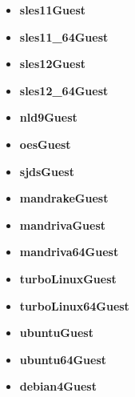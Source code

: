 \begin{itemize}
\item \textbf{sles11Guest} 
\end{itemize}
\begin{itemize}
\item \textbf{sles11\_64Guest} 
\end{itemize}
\begin{itemize}
\item \textbf{sles12Guest} 
\end{itemize}
\begin{itemize}
\item \textbf{sles12\_64Guest} 
\end{itemize}
\begin{itemize}
\item \textbf{nld9Guest} 
\end{itemize}
\begin{itemize}
\item \textbf{oesGuest} 
\end{itemize}
\begin{itemize}
\item \textbf{sjdsGuest} 
\end{itemize}
\begin{itemize}
\item \textbf{mandrakeGuest} 
\end{itemize}
\begin{itemize}
\item \textbf{mandrivaGuest} 
\end{itemize}
\begin{itemize}
\item \textbf{mandriva64Guest} 
\end{itemize}
\begin{itemize}
\item \textbf{turboLinuxGuest} 
\end{itemize}
\begin{itemize}
\item \textbf{turboLinux64Guest} 
\end{itemize}
\begin{itemize}
\item \textbf{ubuntuGuest} 
\end{itemize}
\begin{itemize}
\item \textbf{ubuntu64Guest} 
\end{itemize}
\begin{itemize}
\item \textbf{debian4Guest} 
\end{itemize}
